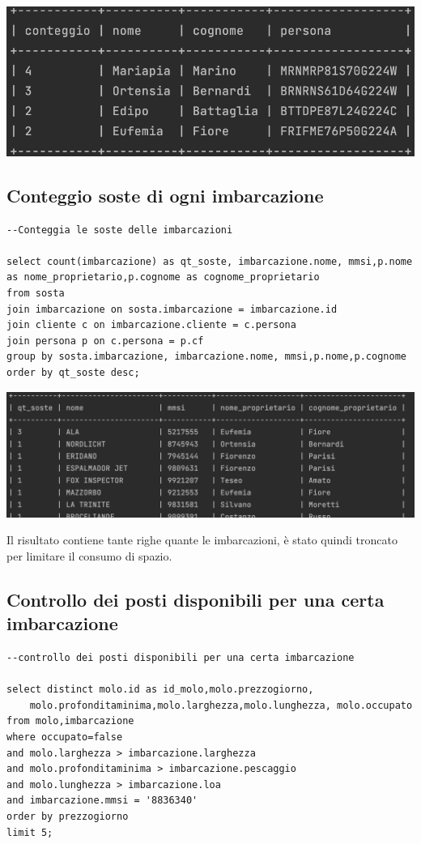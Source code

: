 \begin{center}
    \includegraphics[width= 0.7\linewidth]{img/result_2prenotazioni.png}
\end{center}

\subsection{Conteggio soste di ogni imbarcazione}

\begin{lstlisting}
--Conteggia le soste delle imbarcazioni

select count(imbarcazione) as qt_soste, imbarcazione.nome, mmsi,p.nome as nome_proprietario,p.cognome as cognome_proprietario
from sosta
join imbarcazione on sosta.imbarcazione = imbarcazione.id
join cliente c on imbarcazione.cliente = c.persona
join persona p on c.persona = p.cf
group by sosta.imbarcazione, imbarcazione.nome, mmsi,p.nome,p.cognome
order by qt_soste desc;
\end{lstlisting}

\begin{center}
    \includegraphics[width= 0.8\linewidth]{img/result_sosteimb.png}
\end{center}

Il risultato contiene tante righe quante le imbarcazioni, è stato quindi troncato per limitare il consumo di spazio.

\subsection{Controllo dei posti disponibili per una certa imbarcazione}
\begin{lstlisting}
--controllo dei posti disponibili per una certa imbarcazione

select distinct molo.id as id_molo,molo.prezzogiorno,
    molo.profonditaminima,molo.larghezza,molo.lunghezza, molo.occupato
from molo,imbarcazione
where occupato=false
and molo.larghezza > imbarcazione.larghezza
and molo.profonditaminima > imbarcazione.pescaggio
and molo.lunghezza > imbarcazione.loa
and imbarcazione.mmsi = '8836340'
order by prezzogiorno
limit 5;
\end{lstlisting}

